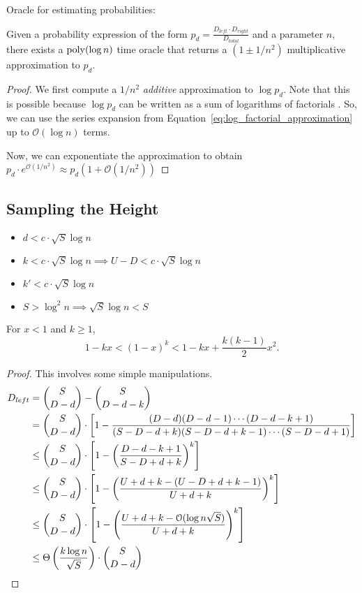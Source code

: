 Oracle for estimating probabilities:
\begin{lemma}
\label{lem:probability_approximation_oracle}

Given a probability expression of the form $p_d = \frac{D_{left}\cdot D_{right}}{D_{total}}$ and a parameter $n$,
there exists a $\mathrm{poly}(\log n)$ time oracle that returns a $\left( 1\pm 1/n^2\right)$
multiplicative approximation to $p_d$.%
\end{lemma}
\begin{proof}
We first compute a $1/n^2$ \emph{additive} approximation to $\log p_d$.
Note that this is possible because $\log p_d$ can be written as a sum of logarithms of factorials .
So, we can use the series expansion from Equation~\ref{eq:log_factorial_approximation} up to $\mathcal O(\log n)$ terms.

Now, we can exponentiate the approximation to obtain
$p_d\cdot e^{\mathcal O(1/n^2)} \approx p_d\left( 1 + \mathcal O(1/n^2)\right)$
\end{proof}



\subsection{Sampling the Height}%
\label{sub:sampling_the_height}


\begin{itemize}
    \item $d < c\cdot \sqrt S \log n$
    \item $k < c\cdot \sqrt S \log n \implies U-D < c\cdot \sqrt S \log n$
    \item $k' < c\cdot \sqrt S \log n$
    \item $S > \log^2 n \implies \sqrt S \log n < S$
\end{itemize}

\begin{lemma}
\label{lem:taylor_bound}
For $x < 1$ and $k\ge 1$,
\[
1-kx < (1-x)^k < 1 - kx + \frac{k(k-1)}{2}x^2.
\]
\end{lemma}


\DLeftBound*
\begin{proof}
This involves some simple manipulations.
\begin{align}
D_{left} &= {{S}\choose{D-d}}-{{S}\choose{D-d-k}}\\
&= {{S}\choose{D-d}}\cdot \left[1-\frac{(D-d)(D-d-1)\cdots(D-d-k+1)}{(S-D-d+k)(S-D-d+k-1)\cdots(S-D-d+1)}\right]\\
&\le {{S}\choose{D-d}}\cdot \left[1-\left(\frac{D-d-k+1}{S-D+d+k}\right)^k\right]\\
&\le {{S}\choose{D-d}}\cdot \left[1-\left(\frac{U+d+k-(U-D+d+k-1)}{U+d+k}\right)^k\right]\\
&\le {{S}\choose{D-d}}\cdot \left[1-\left(\frac{U+d+k-\Bo(\log n\sqrt{S})}{U+d+k}\right)^k\right]\\
&\le \Theta \left( \frac{k\log n}{\sqrt{S}} \right) \cdot{{S}\choose{D-d}}
\end{align}
\end{proof}


